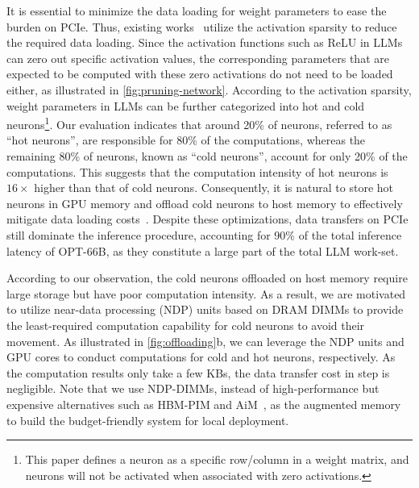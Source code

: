 It is essential to minimize the data loading for weight parameters to ease the burden on PCIe. Thus, existing works~\cite{liu2023deja, song2023powerinfer, xue2024powerinfer} utilize the activation sparsity to reduce the required data loading.
Since the activation functions such as ReLU in LLMs can zero out specific activation values, the corresponding parameters that are expected to be computed with these zero activations do not need to be loaded either, as illustrated in \fig \ref{fig:pruning-network}.  According to the activation sparsity, weight parameters in LLMs can be further categorized into hot and cold neurons\footnote{This paper defines a neuron as a specific row/column in a weight matrix, and neurons will not be activated when associated with zero activations.}. Our evaluation indicates that around 20\% of neurons, referred to as ``hot neurons'', are responsible for 80\% of the computations, whereas the remaining 80\% of neurons, known as ``cold neurons'', account for only 20\% of the computations. This suggests that the computation intensity of hot neurons is $16 \times$ higher than that of cold neurons. Consequently, it is natural to store hot neurons in GPU memory and offload cold neurons to host memory to effectively mitigate data loading costs~\cite{liu2023deja}. Despite these optimizations, data transfers on PCIe still dominate the inference procedure, accounting for 90\% of the total inference latency of OPT-66B, as they constitute a large part of the total LLM work-set.

According to our observation, the cold neurons offloaded on host memory require large storage but have poor computation intensity. As a result, we are motivated to utilize near-data processing (NDP) units based on DRAM DIMMs to provide the least-required computation capability for cold neurons to avoid their movement. As illustrated in \fig \ref{fig:offloading}b, we can leverage the NDP units and GPU cores to conduct computations for cold and hot neurons, respectively. As the computation results only take a few KBs, the data transfer cost in step  is negligible. Note that we use NDP-DIMMs, instead of high-performance but expensive alternatives such as HBM-PIM and AiM~\cite{park2024attacc, heo2024neupims, gao2017tetris, cong2017aim}, as the augmented memory to build the budget-friendly system for local deployment. 


